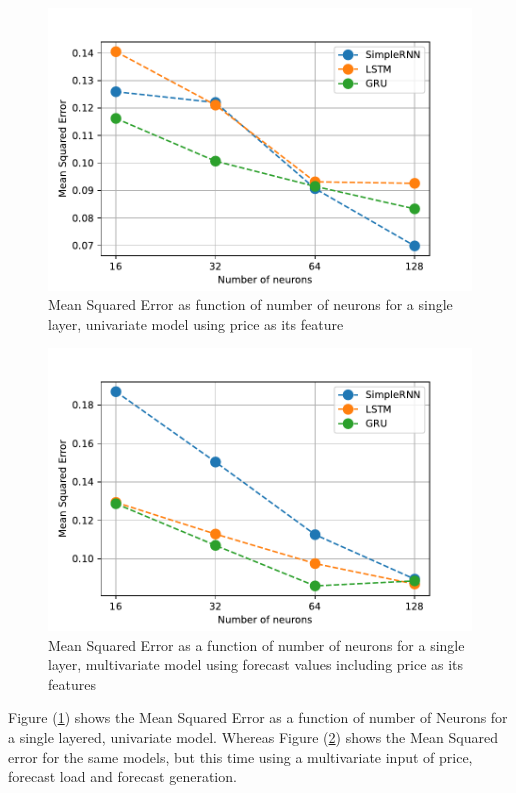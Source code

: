 \documentclass
[twocolumn,
secnumarabic,
nobibnotes,
aps,
prl,
reprint,
groupedaddress,
amsmath,
amssymb,
]{revtex4-2}
\begin{document}
\begin{figure}
  \includegraphics[width=\columnwidth]{figures/small_architecture_grid_search.pdf}
  \caption{\label{fig_smallgs}Mean Squared Error as function of number of neurons for a single layer, univariate model using price as its feature}
\end{figure}

\begin{figure}
  \includegraphics[width=\columnwidth]{figures/multivariate_forecast_small_architecture_grid_search.pdf}
  \caption{\label{fig_smallmultigs}Mean Squared Error as a function of number of neurons for a single layer, multivariate model using forecast values including price as its features}
\end{figure}

Figure (\ref{fig_smallgs}) shows the Mean Squared Error as a function of number of Neurons for a single layered, univariate model. Whereas Figure (\ref{fig_smallmultigs}) shows the Mean Squared error for the same models, but this time using a multivariate input of price, forecast load and forecast generation.
\end{document}
